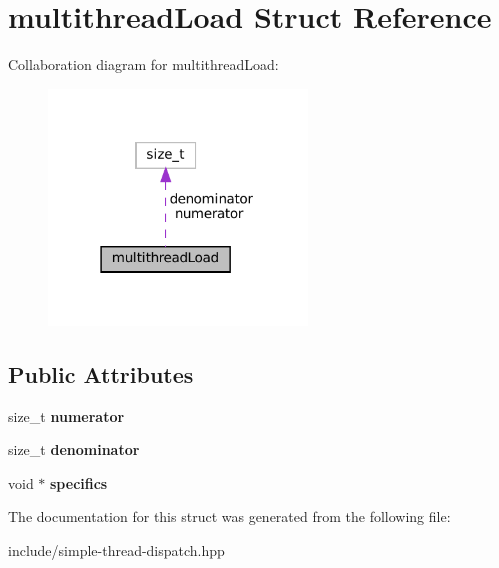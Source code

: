 \hypertarget{structmultithreadLoad}{}\section{multithread\+Load Struct Reference}
\label{structmultithreadLoad}


Collaboration diagram for multithread\+Load\+:\nopagebreak
\begin{figure}[H]
\begin{center}
\leavevmode
\includegraphics[width=195pt]{structmultithreadLoad__coll__graph}
\end{center}
\end{figure}
\subsection*{Public Attributes}
\begin{DoxyCompactItemize}
\item 
\mbox{\label{structmultithreadLoad_a35b5fc855f655778297d6c0577f15237}} 
size\+\_\+t {\bfseries numerator}
\item 
\mbox{\label{structmultithreadLoad_a8ce86b198ddd084d472b32a84d31ee45}} 
size\+\_\+t {\bfseries denominator}
\item 
\mbox{\label{structmultithreadLoad_a79b42a3037e255be1d9158a74bad2836}} 
void $\ast$ {\bfseries specifics}
\end{DoxyCompactItemize}


The documentation for this struct was generated from the following file\+:\begin{DoxyCompactItemize}
\item 
include/simple-\/thread-\/dispatch.\+hpp\end{DoxyCompactItemize}
